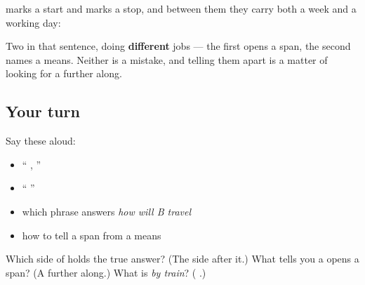 \begin{grammarlens}[title={Grammar Lens: the chapter in one sentence}]
\textbf{} marks a start and \textbf{} marks a stop, and between them they carry both a week and a working day:

\textbf{       }

Two \textbf{} in that sentence, doing \textbf{different} jobs — the first opens a span, the second names a means. Neither is a mistake, and telling them apart is a matter of looking for a \textbf{} further along.
\end{grammarlens}

\subsection*{Your turn}
Say these aloud:

\begin{itemize}
\raggedright
  \item \textquotedblleft{}   ,   \textquotedblright{}
  \item \textquotedblleft{}       \textquotedblright{}
  \item which phrase answers \emph{how will B travel}
  \item how to tell a span \textbf{} from a means \textbf{}
\end{itemize}

\begin{tcolorbox}[breakable,colback=teal!4,colframe=teal!35!black,title={Before you move on}]
Which side of \textbf{} holds the true answer? (The side after it.) What tells you a \textbf{} opens a span? (A \textbf{} further along.) What is \emph{by train}? (\textbf{ }.)
\end{tcolorbox}
